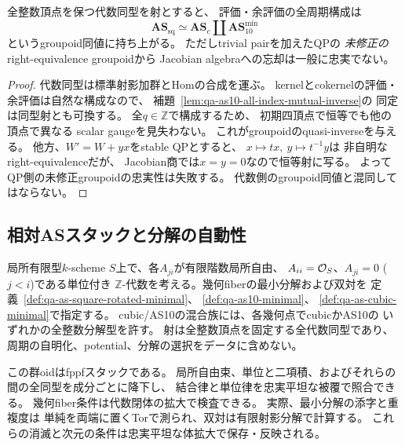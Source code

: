 \begin{proposition}
\label{prop:qa-as10-groupoid}
全整数頂点を保つ代数同型を射とすると、
評価・余評価の全周期構成は
\[
\mathbf{AS}_{\mathrm{sq}}\simeq
 \mathbf{AS}_{c}\amalg
 \mathbf{AS}_{10}^{\mathrm{min}}
\]
というgroupoid同値に持ち上がる。
ただしtrivial pairを加えたQPの
\emph{未修正の}right-equivalence groupoidから
Jacobian algebraへの忘却は一般に忠実でない。
\end{proposition}
\begin{proof}
代数同型は標準射影加群とHomの合成を運ぶ。
kernelとcokernelの評価・余評価は自然な構成なので、
補題~\ref{lem:qa-as10-all-index-mutual-inverse}の
同定は同型射とも可換する。
全$q\in\mathbb Z$で構成するため、
初期四頂点で恒等でも他の頂点で異なる
scalar gaugeを見失わない。
これがgroupoidのquasi-inverseを与える。
他方、$W'=W+yx$をstable QPとすると、
$x\mapsto tx,\ y\mapsto t^{-1}y$は
非自明なright-equivalenceだが、
Jacobian商では$x=y=0$なので恒等射に写る。
よってQP側の未修正groupoidの忠実性は失敗する。
代数側のgroupoid同値と混同してはならない。
\end{proof}

\subsection{相対ASスタックと分解の自動性}
\label{subsec:qa-relative-as-perfectness}

\begin{definition}[成分局所自由な相対AS族]
\label{def:qa-relative-as-flat-stack}
局所有限型$k$-scheme $S$上で、各$A_{ji}$が有限階数局所自由、
$A_{ii}=\mathcal O_S$、$A_{ji}=0$ ($j<i$)である単位付き
\(\mathbb Z\)-代数を考える。幾何fiberの最小分解および双対を
定義~\ref{def:qa-as-square-rotated-minimal}、
\ref{def:qa-as10-minimal}、
\ref{def:qa-as-cubic-minimal}で指定する。
cubic/AS10の混合族には、各幾何点でcubicかAS10の
いずれかの全整数分解型を許す。
射は全整数頂点を固定する全代数同型であり、
周期の自明化、potential、分解の選択をデータに含めない。
\end{definition}

この群oidはfppfスタックである。
局所自由束、単位と二項積、およびそれらの間の全同型を成分ごとに降下し、
結合律と単位律を忠実平坦な被覆で照合できる。
幾何fiber条件は代数閉体の拡大で検査できる。
実際、最小分解の添字と重複度は
単純を両端に置くTorで測られ、双対は有限射影分解で計算する。
これらの消滅と次元の条件は忠実平坦な体拡大で保存・反映される。

